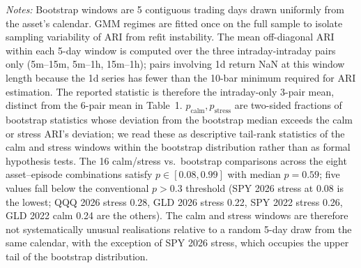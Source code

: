 \documentclass[preprint,12pt,authoryear]{elsarticle}
\newcommand{\SPY}{SPY}
\newcommand{\GLD}{GLD}
\begin{document}
\begin{table}[H]
\centering
\small
\setlength{\tabcolsep}{4pt}
\caption{Bootstrap test: mean off-diag.\ ARI over 1{,}000 random 5-day windows.}
\label{tab:bootstrap_5d}
\par\medskip
{\footnotesize\justifying
\textit{Notes:} Bootstrap windows are 5 contiguous trading days drawn uniformly from the asset's calendar. GMM regimes are fitted once on the full sample to isolate sampling variability of ARI from refit instability. The mean off-diagonal ARI within each 5-day window is computed over the three intraday-intraday pairs only (5m--15m, 5m--1h, 15m--1h); pairs involving 1d return NaN at this window length because the 1d series has fewer than the 10-bar minimum required for ARI estimation. The reported statistic is therefore the intraday-only 3-pair mean, distinct from the 6-pair mean in Table~1. $p_{\text{calm}}, p_{\text{stress}}$ are two-sided fractions of bootstrap statistics whose deviation from the bootstrap median exceeds the calm or stress ARI's deviation; we read these as descriptive tail-rank statistics of the calm and stress windows within the bootstrap distribution rather than as formal hypothesis tests. The 16 calm/stress vs.\ bootstrap comparisons across the eight asset--episode combinations satisfy $p \in [0.08, 0.99]$ with median $p = 0.59$; five values fall below the conventional $p > 0.3$ threshold (\SPY{} 2026 stress at 0.08 is the lowest; QQQ 2026 stress 0.28, \GLD{} 2026 stress 0.22, \SPY{} 2022 stress 0.26, \GLD{} 2022 calm 0.24 are the others). The calm and stress windows are therefore not systematically unusual realisations relative to a random 5-day draw from the same calendar, with the exception of \SPY{} 2026 stress, which occupies the upper tail of the bootstrap distribution.
\par}
\end{table}
\end{document}
